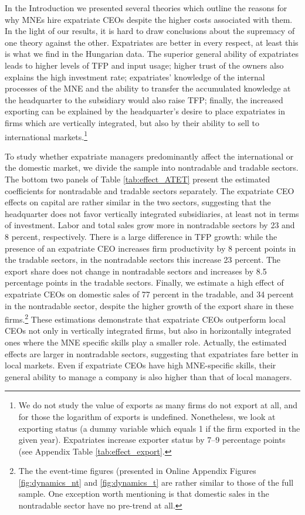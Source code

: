 \documentclass[12pt,a4paper]{article}
\begin{document}
In the Introduction we presented several theories which outline the reasons for why MNEs hire expatriate CEOs despite the higher costs associated with them. In the light of our results, it is hard to draw conclusions about the supremacy of one theory against the other. Expatriates are better in every respect, at least this is what we find in the Hungarian data. The superior general ability of expatriates leads to higher levels of TFP and input usage; higher trust of the owners also explains the high investment rate; expatriates' knowledge of the internal processes of the MNE and the ability to transfer the accumulated knowledge at the headquarter to the subsidiary would also raise TFP; finally, the increased exporting can be explained by the headquarter's desire to place expatriates in firms which are vertically integrated, but also by their ability to sell to international markets.\footnote{We do not study the value of exports as many firms do not export at all, and for those the logarithm of exports is undefined. Nonetheless, we look at exporting status (a dummy variable which equals 1 if the firm exported in the given year). Expatriates increase exporter status by 7--9 percentage points (see Appendix Table \ref{tab:effect_export}.}   

To study whether expatriate managers predominantly affect the international or the domestic market, we divide the sample into nontradable and tradable sectors. The bottom two panels of Table \ref{tab:effect_ATET} present the estimated coefficients for nontradable and tradable sectors separately. The expatriate CEO effects on capital are rather similar in the two sectors, suggesting that the headquarter does not favor vertically integrated subsidiaries, at least not in terms of investment. Labor and total sales grow more in nontradable sectors by 23 and 8 percent, respectively. There is a large difference in TFP growth: while the presence of an expatriate CEO increases firm productivity by 8 percent points in the tradable sectors, in the nontradable sectors this increase 23 percent. The export share does not change in nontradable sectors and increases by 8.5 percentage points in the tradable sectors. Finally, we estimate a high effect of expatriate CEOs on domestic sales of 77 percent in the tradable, and 34 percent in the nontradable sector, despite the higher growth of the export share in these firms.\footnote{The the event-time figures (presented in Online Appendix Figures \ref{fig:dynamics_nt} and \ref{fig:dynamics_t} are rather similar to those of the full sample. One exception worth mentioning is that domestic sales in the nontradable sector have no pre-trend at all.} These estimations demonstrate that expatriate CEOs outperform local CEOs not only in vertically integrated firms, but also in horizontally integrated ones where the MNE specific skills play a smaller role. Actually, the estimated effects are larger in nontradable sectors, suggesting that expatriates fare better in local markets. Even if expatriate CEOs have high MNE-specific skills, their general ability to manage a company is also higher than that of local managers.
\end{document}
